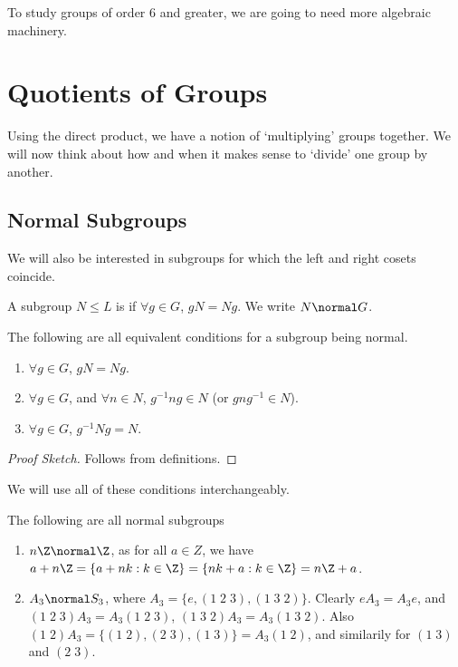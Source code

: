 \documentclass[a4paper]{scrartcl}
\newcommand{\newchapter}{\section}
\newcommand{\newsection}{\subsection}
\begin{document}
To study groups of order $6$ and greater, we are going to need more algebraic machinery.
 
\newchapter{Quotients of Groups}

Using the direct product, we have a notion of `multiplying' groups together. We will now think about how and when it makes sense to `divide' one group by another. 

\newsection{Normal Subgroups}

We will also be interested in subgroups for which the left and right cosets coincide.

\begin{definition}
	A subgroup $N \leq L$ is  if $\forall g \in G$, $gN = Ng$. We write $N \normal G$.
\end{definition}

\begin{proposition}
	The following are all equivalent conditions for a subgroup being normal.
	\begin{enumerate}[label=(\roman*)]
		\item $\forall g \in G$, $gN = Ng$.
		\item $\forall g \in G$, and $\forall n \in N$, $g^{-1} n g \in N$ (or $g n g^{-1} \in N$).
		\item $\forall g \in G$, $g^{-1} N g = N$.
	\end{enumerate}
\end{proposition}
\begin{proof}[Proof Sketch]
	Follows from definitions.
\end{proof}

We will use all of these conditions interchangeably.

\begin{example}
	The following are all normal subgroups
	\begin{enumerate}[label=(\roman*)]
		\item $n\Z \normal \Z$, as for all $a \in Z$, we have
		$a + n\Z = \{a + nk : k \in \Z\} = \{nk + a : k \in \Z\} = n\Z + a$.
		\item 
		$A_3 \normal S_3$, where $A_3 = \{e, (1\; 2\; 3), (1\; 3\; 2)\}$. Clearly $eA_3 = A_3 e$, and $(1\;2\;3)A_3 = A_3 (1\; 2\; 3)$, $(1\; 3\; 2)A_3 = A_3 (1\; 3\; 2)$. Also $(1\; 2)A_3 = \{(1\; 2), (2\; 3), (1\; 3)\} = A_3(1\; 2)$, and similarily for $(1\;3)$ and $(2\; 3)$.
	\end{enumerate}
\end{example}
\end{document}
